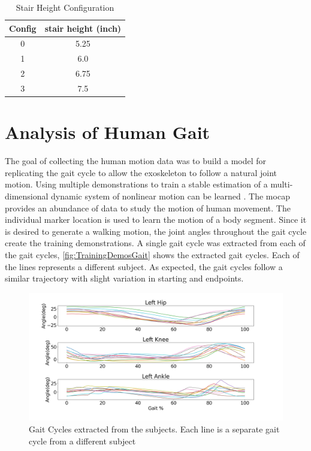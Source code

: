 \begin{table}[h!]
\centering
 \begin{tabular}{||c c ||} 
 \hline
 Config & stair height (inch) \\ [0.5ex] 
 \hline\hline
 0 & 5.25  \\ 
 \hline
 1 & 6.0  \\
 \hline
 2 & 6.75  \\
 \hline
 3 & 7.5 \\
 \hline
\end{tabular}
\caption{Stair Height Configuration}
\label{tab:stairs}
\end{table}



\section{Analysis of Human Gait}

The goal of collecting the human motion data was to build a model for replicating the gait cycle to allow the exoskeleton to follow a natural joint motion. Using multiple demonstrations to train a stable estimation of a multi-dimensional dynamic system of nonlinear motion can be learned \cite{li2018development}. The mocap provides an abundance of data to study the motion of human movement. The individual marker location is used to learn the motion of a body segment. Since it is desired to generate a walking motion, the joint angles throughout the gait cycle create the training demonstrations.  A single gait cycle was extracted from each of the gait cycles,  \autoref{fig:TrainingDemosGait} shows the extracted gait cycles. Each of the lines represents a different subject. As expected, the gait cycles follow a similar trajectory with slight variation in starting and endpoints. 

\begin{figure}[h]
    \centering
    \includegraphics[scale=0.30]{images/gait_data/gaittraining.png}
    \caption[Gait Training Demos]{Gait Cycles extracted from the subjects. Each line is a separate gait cycle from a different subject}
    \label{fig:TrainingDemosGait}
\end{figure}

